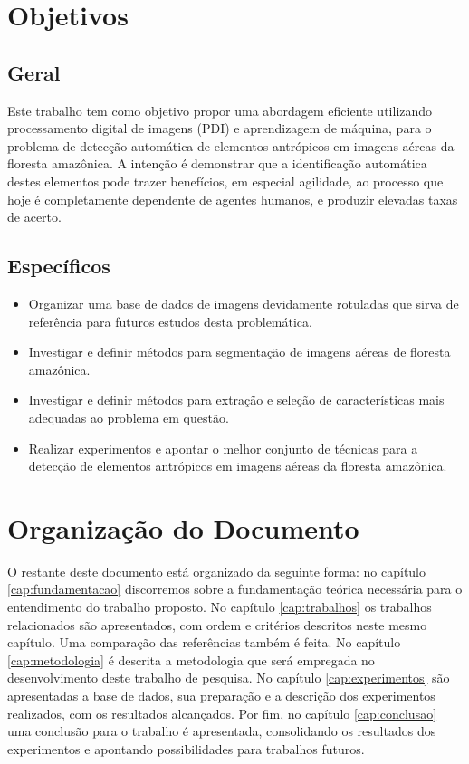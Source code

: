 \section{Objetivos}

\subsection{Geral}

Este trabalho tem como objetivo propor uma abordagem eficiente utilizando processamento digital de imagens (PDI) e aprendizagem de máquina, para o problema de detecção automática de elementos antrópicos em imagens aéreas da floresta amazônica. A intenção é demonstrar que a identificação automática destes elementos pode trazer benefícios, em especial agilidade, ao processo que hoje é completamente dependente de agentes humanos, e produzir elevadas taxas de acerto.

\subsection{Específicos}

\begin{itemize}
    \item Organizar uma base de dados de imagens devidamente rotuladas que sirva de referência para futuros estudos desta problemática.
    \item Investigar e definir métodos para segmentação de imagens aéreas de floresta amazônica.
    \item Investigar e definir métodos para extração e seleção de características mais adequadas ao problema em questão.
    \item Realizar experimentos e apontar o melhor conjunto de técnicas para a detecção de elementos antrópicos em imagens aéreas da floresta amazônica.
\end{itemize}

\section{Organização do Documento}

O restante deste documento está organizado da seguinte forma: no capítulo \ref{cap:fundamentacao} discorremos sobre a fundamentação teórica necessária para o entendimento do trabalho proposto. No capítulo \ref{cap:trabalhos} os trabalhos relacionados são apresentados, com ordem e critérios descritos neste mesmo capítulo. Uma comparação das referências também é feita. No capítulo \ref{cap:metodologia} é descrita a metodologia que será empregada no desenvolvimento deste trabalho de pesquisa. No capítulo \ref{cap:experimentos} são apresentadas a base de dados, sua preparação e a descrição dos experimentos realizados, com os resultados alcançados. Por fim, no capítulo \ref{cap:conclusao} uma conclusão para o trabalho é apresentada, consolidando os resultados dos experimentos e apontando possibilidades para trabalhos futuros.
